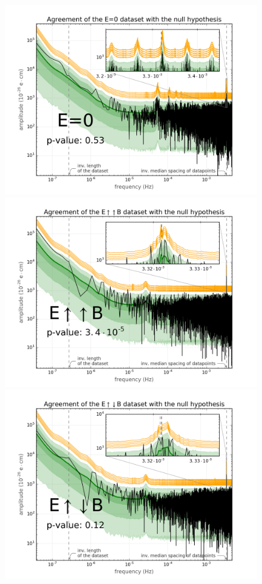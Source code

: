 \begin{figure}[h!]
  \centering \includegraphics[width=0.9\linewidth]{gfx/axions/cycle-level_E0_detection.png}
  \centering \includegraphics[width=0.9\linewidth]{gfx/axions/cycle-level_EBp_detection.png}
  \centering \includegraphics[width=0.9\linewidth]{gfx/axions/cycle-level_EBap_detection.png}

\end{figure}

